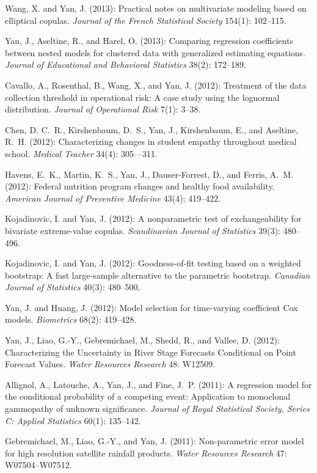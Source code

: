 \documentclass[Statistics]{vita}
\begin{document}
\begin{vita}
\begin{Publications}
\begin{RefereedJournalArticles}
  \item *Wang, X. and Yan, J. (2013): Practical notes on multivariate modeling based on elliptical copulas. {\em Journal of the French Statistical Society\/} 154(1): 102--115.
  \item Yan, J., Aseltine, R., and Harel, O. (2013): Comparing regression coefficients between nested models for clustered data with generalized estimating equations. {\em Journal of Educational and Behavioral Statistics\/} 38(2): 172--189.
  \item Cavallo, A., Rosenthal, B., Wang, X., and Yan, J. (2012): Treatment of the data collection threshold in operational risk: {A} case study using the lognormal distribution. {\em Journal of Operational Risk\/} 7(1): 3--38.
  \item Chen, D. C.~R., Kirshenbaum, D.~S., Yan, J., Kirshenbaum, E., and Aseltine,  R.~H. (2012): Characterizing changes in student empathy throughout medical school. {\em Medical Teacher\/} 34(4): 305--–311.
  \item Havens, E.~K., Martin, K.~S., Yan, J., Dauser-Forrest, D., and Ferris, A.~M. (2012): Federal nutrition program changes and healthy food availability. {\em  American Journal of Preventive Medicine\/} 43(4): 419--422.
  \item Kojadinovic, I. and Yan, J. (2012): A nonparametric test of exchangeability for bivariate extreme-value copulas. {\em Scandinavian Journal of Statistics\/} 39(3): 480--496.
  \item Kojadinovic, I. and Yan, J. (2012): Goodness-of-fit testing based on a weighted bootstrap: A fast large-sample alternative to the parametric bootstrap. {\em Canadian Journal of Statistics\/} 40(3): 480--500.
  \item Yan, J. and Huang, J. (2012): Model selection for time-varying coefficient Cox models. {\em Biometrics\/} 68(2): 419--428.
  \item Yan, J., Liao, G.-Y., Gebremichael, M., Shedd, R., and Vallee, D. (2012): Characterizing the Uncertainty in River Stage Forecasts Conditional on Point Forecast Values. {\em Water Resources Research\/} 48: W12509.
  \item Allignol, A., Latouche, A., Yan, J., and Fine, J.~P. (2011):  A regression model for the conditional probability of a competing event: {A}pplication to monoclonal gammopathy of unknown significance. {\em Journal of Royal Statistical Society, Series C: Applied Statistics\/}  60(1): 135--142.
  \item Gebremichael, M., Liao, G.-Y., and Yan, J. (2011): Non-parametric error model for high resolution satellite rainfall products. {\em Water Resources Research\/} 47: W07504--W07512.

\end{RefereedJournalArticles}
\end{Publications}
\end{vita}
\end{document}
